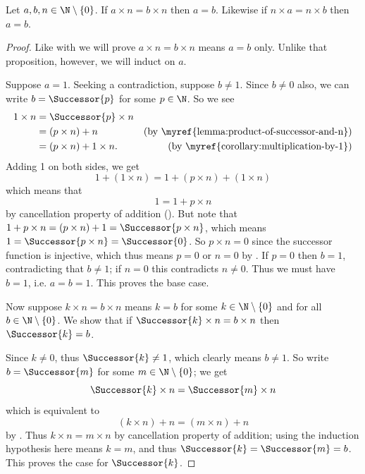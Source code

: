 \begin{proposition}\label{prop:multiplication-cancellation-property}
    Let $a, b, n \in \N \setminus \{0\}$. If $a \times n = b \times n$ then $a = b$. Likewise if $n \times a = n \times b$ then $a = b$.
\end{proposition}
\begin{proof}
    Like with  we will prove $a \times n = b \times n$ means $a = b$ only. Unlike that proposition, however, we will induct on $a$.

    Suppose $a = 1$. Seeking a contradiction, suppose $b \neq 1$. Since $b \neq 0$ also, we can write $b = \Successor{p}$ for some $p \in \N$. So we see
    \begin{align*}
        1 \times n &= \Successor{p} \times n\\
        &= (p \times n) + n & (\text{by \myref{lemma:product-of-successor-and-n}})\\
        &= (p \times n) + 1 \times n. & (\text{by \myref{corollary:multiplication-by-1}})
    \end{align*}
    Adding 1 on both sides, we get
    \[
        1 + (1 \times n) = 1 + (p \times n) + (1 \times n)
    \]
    which means that
    \[
        1 = 1 + p \times n
    \]
    by cancellation property of addition (). But note that $1 + p \times n = (p \times n) + 1 = \Successor{p \times n}$, which means $1 = \Successor{p \times n} = \Successor{0}$. So $p \times n = 0$ since the successor function is injective, which thus means $p = 0$ or $n = 0$ by . If $p = 0$ then $b = 1$, contradicting that $b \neq 1$; if $n = 0$ this contradicts $n \neq 0$. Thus we must have $b = 1$, i.e. $a = b = 1$. This proves the base case.

    Now suppose $k \times n = b \times n$ means $k = b$ for some $k \in \N \setminus \{0\}$ and for all $b \in \N \setminus \{0\}$. We show that if $\Successor{k} \times n = b \times n$ then $\Successor{k} = b$.

    Since $k \neq 0$, thus $\Successor{k} \neq 1$, which clearly means $b \neq 1$. So write $b = \Successor{m}$ for some $m \in \N \setminus \{0\}$; we get
    \[
        \Successor{k} \times n = \Successor{m} \times n
    \]
    which is equivalent to
    \[
        (k \times n) + n = (m \times n) + n
    \]
    by . Thus $k \times n = m \times n$ by cancellation property of addition; using the induction hypothesis here means $k = m$, and thus $\Successor{k} = \Successor{m} = b$. This proves the case for $\Successor{k}$.
\end{proof}

